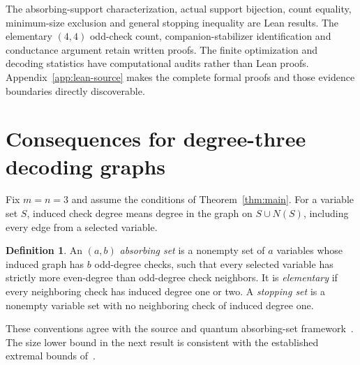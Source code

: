 \documentclass[11pt]{article}
\theoremstyle{definition}
\newtheorem{definition}[theorem]{Definition}
\theoremstyle{remark}
\begin{document}
The absorbing-support characterization, actual support bijection, count
equality, minimum-size exclusion and general stopping inequality are
Lean results. The elementary $(4,4)$ odd-check count, companion-stabilizer
identification and conductance argument retain written proofs. The finite
optimization and decoding statistics have computational audits rather than
Lean proofs. Appendix~\ref{app:lean-source} makes the complete formal
proofs and those evidence boundaries directly discoverable.

\section{Consequences for degree-three decoding graphs}\label{sec:structure}

Fix $m=n=3$ and assume the conditions of Theorem~\ref{thm:main}.
For a variable set $S$, induced check degree means degree in the graph
on $S\cup N(S)$, including every edge from a selected variable.

\begin{definition}
An $(a,b)$ \emph{absorbing set} is a nonempty set of $a$ variables whose induced
graph has $b$ odd-degree checks, such that every selected variable has
strictly more even-degree than odd-degree check neighbors. It is
\emph{elementary} if every neighboring check has induced degree one or
two. A \emph{stopping set} is a nonempty variable set with no neighboring
check of induced degree one.
\end{definition}

These conventions agree with the source and quantum absorbing-set
framework~\cite{FHM2026,MPK2026}. The size lower bound in the next result
is consistent with the established extremal bounds of~\cite{MBK2023}.
\end{document}

